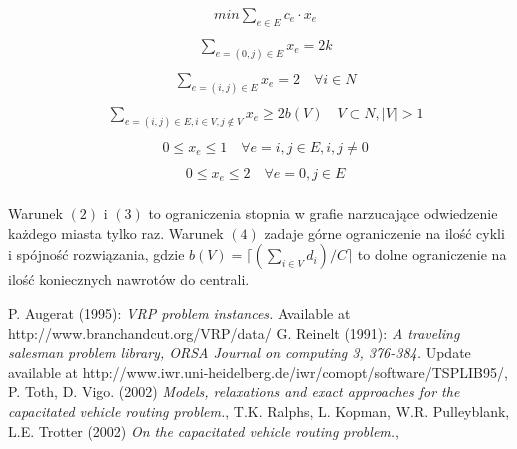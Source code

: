 \documentclass[fleqn,11pt]{article}
\begin{document}
\begin{equation}
    \begin{aligned}
        & min \sum_{e \in E}^{} { c_e \cdot x_e } \\
    \end{aligned}
\end{equation}
\begin{equation}
    \begin{aligned}
        & \sum_{e = (0,j) \in E}^{} { x_e = 2k } \\
    \end{aligned}
\end{equation}
\begin{equation}
    \begin{aligned}
        & \sum_{e = (i,j) \in E}^{} { x_e = 2 } \quad {\forall{i \in N}} \\
    \end{aligned}
\end{equation}
\begin{equation}
    \begin{aligned}
        & \sum_{e = (i,j) \in E, i \in V, j \notin V}^{} { x_e \geq 2b(V) } \quad  {V \subset N, |V| > 1} \\
    \end{aligned}
\end{equation}
\begin{equation}
    \begin{aligned}
        & {0 \leq x_e \leq 1} \quad \forall{e = {i, j}} \in E, i, j \neq 0 \\
    \end{aligned}
\end{equation}
\begin{equation}
    \begin{aligned}
        & {0 \leq x_e \leq 2} \quad \forall{e = {0, j}} \in E \\
    \end{aligned}
\end{equation}


Warunek $(2)$ i $(3)$ to ograniczenia stopnia w grafie narzucające odwiedzenie każdego miasta tylko raz. Warunek $(4)$ zadaje górne ograniczenie na ilość cykli i spójność rozwiązania, gdzie $b(V) = \lceil {(\sum_{i \in V}{d_i})/C}\rceil$   to dolne ograniczenie na ilość koniecznych nawrotów do centrali.

\begin{thebibliography}{9}
 P. Augerat (1995): {\it VRP problem instances.}  Available at http://www.branchandcut.org/VRP/data/
 G. Reinelt (1991): {\it A traveling salesman problem library, ORSA Journal on computing 3, 376-384.}  Update available at http://www.iwr.uni-heidelberg.de/iwr/comopt/software/TSPLIB95/,
 P. Toth, D. Vigo. (2002) {\it Models, relaxations and exact approaches for the capacitated vehicle routing problem.},
 T.K. Ralphs, L. Kopman, W.R. Pulleyblank, L.E. Trotter (2002) {\it On the capacitated vehicle routing problem.},
\end{thebibliography}
\end{document}

